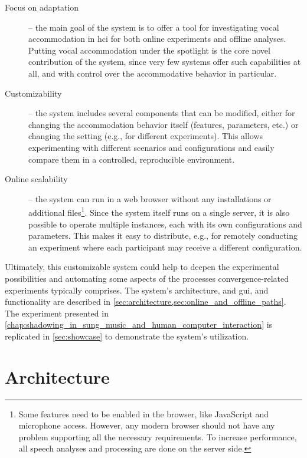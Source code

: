 \begin{description}
	\item[Focus on adaptation] --
	the main goal of the system is to offer a tool for investigating vocal accommodation in \ac{hci} for both online experiments and offline analyses.
	Putting vocal accommodation under the spotlight is the core novel contribution of the system, since very few systems offer such capabilities at all, and with control over the accommodative behavior in particular.
	
	\item[Customizability] --
	the system includes several components that can be modified, either for changing the accommodation behavior itself (features, parameters, etc.) or changing the setting (e.g., for different experiments).
	This allows experimenting with different scenarios and configurations and easily compare them in a controlled, reproducible environment.
	
	\item[Online scalability] --
	the system can run in a web browser without any installations or additional files\footnote{Some features need to be enabled in the browser, like JavaScript and microphone access.
	However, any modern browser should not have any problem supporting all the necessary requirements.
	To increase performance, all speech analyses and processing are done on the server side.}.
	Since the system itself runs on a single server, it is also possible to operate multiple instances, each with its own configurations and parameters.
	This makes it easy to distribute, e.g., for remotely conducting an experiment where each participant may receive a different configuration.
\end{description}
%
Ultimately, this customizable system could help to deepen the experimental possibilities and automating some aspects of the processes convergence-related experiments typically comprises.
The system's architecture, and \ac{gui}, and functionality are described in \cref{sec:architecture,sec:online_and_offline_paths}.
The experiment presented in \cref{chap:shadowing_in_sung_music_and_human_computer_interaction} is replicated in \cref{sec:showcase} to demonstrate the system's utilization.

\section{Architecture}
\label{sec:architecture}

